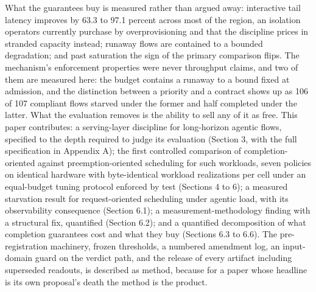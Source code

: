 What the guarantees buy is measured rather than argued away: interactive
tail latency improves by 63.3 to 97.1 percent across most of the region,
an isolation operators currently purchase by overprovisioning and that
the discipline prices in stranded capacity instead; runaway flows are
contained to a bounded degradation; and past saturation the sign of the
primary comparison flips. The mechanism's enforcement properties were
never throughput claims, and two of them are measured here: the budget
contains a runaway to a bound fixed at admission, and the distinction
between a priority and a contract shows up as 106 of 107 compliant flows
starved under the former and half completed under the latter. What the
evaluation removes is the ability to sell any of it as free. This paper
contributes: a serving-layer discipline for long-horizon agentic flows,
specified to the depth required to judge its evaluation (Section 3, with
the full specification in Appendix A); the first controlled comparison
of completion-oriented against preemption-oriented scheduling for such
workloads, seven policies on identical hardware with byte-identical
workload realizations per cell under an equal-budget tuning protocol
enforced by test (Sections 4 to 6); a measured starvation result for
request-oriented scheduling under agentic load, with its observability
consequence (Section 6.1); a measurement-methodology finding with a
structural fix, quantified (Section 6.2); and a quantified decomposition
of what completion guarantees cost and what they buy (Sections 6.3 to
6.6). The pre-registration machinery, frozen thresholds, a numbered
amendment log, an input-domain guard on the verdict path, and the
release of every artifact including superseded readouts, is described as
method, because for a paper whose headline is its own proposal's death
the method is the product.
